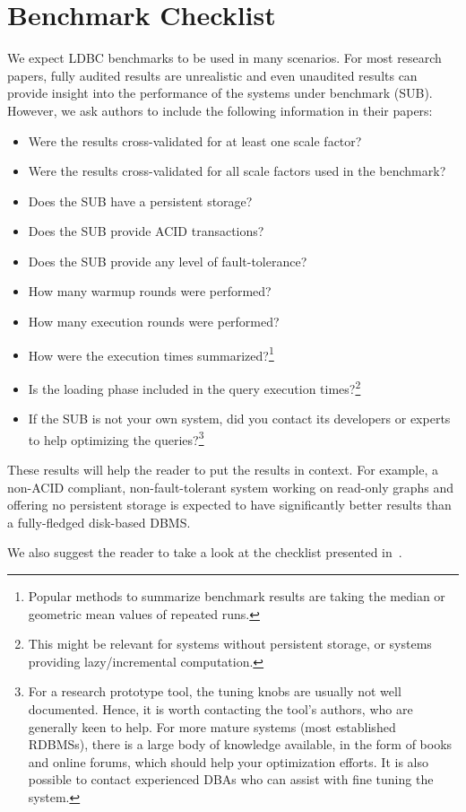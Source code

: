 \chapter{Benchmark Checklist}
\label{sec:benchmark-checklist}

We expect LDBC benchmarks to be used in many scenarios.
For most research papers, fully audited results are unrealistic and even unaudited results can provide insight into the performance of the systems under benchmark (SUB). However, we ask authors to include the following information in their papers:

\begin{itemize}
\item Were the results cross-validated for at least one scale factor?
\item Were the results cross-validated for all scale factors used in the benchmark?
\item Does the SUB have a persistent storage?
\item Does the SUB provide ACID transactions?
\item Does the SUB provide any level of fault-tolerance?
\item How many warmup rounds were performed?
\item How many execution rounds were performed?
\item How were the execution times summarized?\footnote{Popular methods to summarize benchmark results are taking the median or geometric mean values of repeated runs.}
\item Is the loading phase included in the query execution times?\footnote{This might be relevant for systems without persistent storage, or systems providing lazy/incremental computation.}
\item If the SUB is not your own system, did you contact its developers or experts to help optimizing the queries?\footnote{For a research prototype tool, the tuning knobs are usually not well documented. Hence, it is worth contacting the tool's authors, who are generally keen to help. For more mature systems (\eg most established RDBMSs), there is a large body of knowledge available, in the form of books and online forums, which should help your optimization efforts. It is also possible to contact experienced DBAs who can assist with fine tuning the system.}
\end{itemize}

These results will help the reader to put the results in context. For example, a non-ACID compliant, non-fault-tolerant system working on read-only graphs and offering no persistent storage is expected to have significantly better results than a fully-fledged disk-based DBMS.

We also suggest the reader to take a look at the checklist presented in~\cite{DBLP:conf/sigmod/RaasveldtHGM18}.
